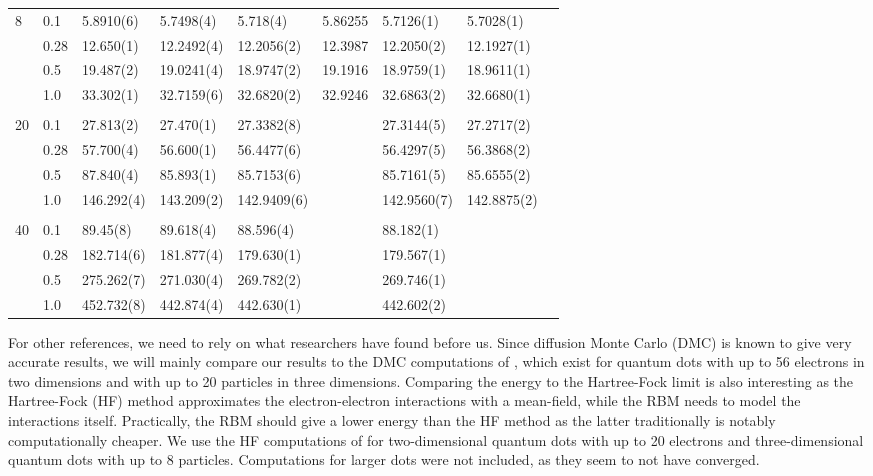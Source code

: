 {\begin{landscape}
\begin{table}
\begin{tabularx}{\hsize}{llR{2.65cm}R{2.65cm}R{2.65cm}R{2.65cm}R{2.65cm}R{2.65cm}R{2.65cm}}
				8 & 0.1 & 5.8910(6) & 5.7498(4) & 5.718(4) & 5.86255 & 5.7126(1) & 5.7028(1) \\ 
				& 0.28 & 12.650(1) & 12.2492(4) & 12.2056(2) & 12.3987 & 12.2050(2) & 12.1927(1) \\
				& 0.5 & 19.487(2) & 19.0241(4) & 18.9747(2) & 19.1916 & 18.9759(1) & 18.9611(1) \\
				& 1.0 & 33.302(1) & 32.7159(6) & 32.6820(2) & 32.9246 & 32.6863(2) & 32.6680(1) \\ 
				\hline \\
				
				20 & 0.1 & 27.813(2) & 27.470(1) & 27.3382(8) & & 27.3144(5) & 27.2717(2) \\ 
				& 0.28 & 57.700(4) & 56.600(1) & 56.4477(6) & & 56.4297(5) & 56.3868(2) \\
				& 0.5 & 87.840(4) & 85.893(1) & 85.7153(6) & & 85.7161(5) & 85.6555(2) \\
				& 1.0 & 146.292(4) & 143.209(2) & 142.9409(6) & & 142.9560(7) & 142.8875(2) \\ \hline \\
				
				40 & 0.1 & 89.45(8) & 89.618(4) & 88.596(4) & & 88.182(1) \\ 
				& 0.28 & 182.714(6) & 181.877(4) & 179.630(1) & & 179.567(1) \\
				& 0.5 & 275.262(7) & 271.030(4) & 269.782(2) & & 269.746(1) \\
				& 1.0 & 452.732(8) & 442.874(4) & 442.630(1) & & 442.602(2) \\ \hline\hline
			\end{tabularx}
		\end{table}
	\end{landscape}
}

For other references, we need to rely on what researchers have found before us. Since diffusion Monte Carlo (DMC) is known to give very accurate results, we will mainly compare our results to the DMC computations of \citet{hogberget_quantum_2013}, which exist for quantum dots with up to 56 electrons in two dimensions and with up to 20 particles in three dimensions. Comparing the energy to the Hartree-Fock limit is also interesting as the Hartree-Fock (HF) method approximates the electron-electron interactions with a mean-field, while the RBM needs to model the interactions itself. Practically, the RBM should give a lower energy than the HF method as the latter traditionally is notably computationally cheaper. We use the HF computations of \citet{mariadason_quantum_2018} for two-dimensional quantum dots with up to 20 electrons and three-dimensional quantum dots with up to 8 particles. Computations for larger dots were not included, as they seem to not have converged.

